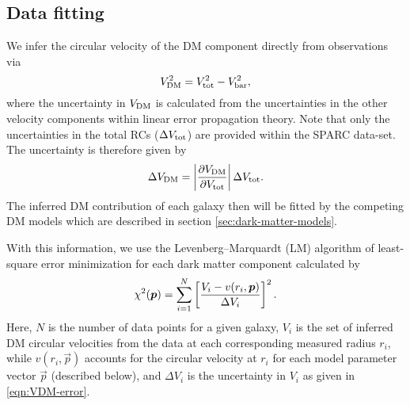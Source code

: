 \subsection{Data fitting}
\label{LM-fitting}

We infer the circular velocity of the DM component directly from observations via 
%
\begin{equation}
	\label{eqn:baryonic-diff}
	\SYMvdark^2 = \SYMvtot^2 - \SYMvbar^2,
\end{equation} 
%
where the uncertainty in $V_{\rm DM}$ is calculated from the uncertainties in the other velocity components within linear error propagation theory. Note that only the uncertainties in the total RCs ($\Delta V_{\rm tot}$) are provided within the SPARC data-set. The uncertainty is therefore given by
%
\begin{equation}\label{eqn:VDM-error}
    \Delta V_{\rm DM} = \abs{\diffpart{V_{\rm DM}}{V_{\rm tot}}} \Delta V_{\rm tot}.
\end{equation} 
%
The inferred DM contribution of each galaxy then will be fitted by the competing DM models which are described in section \ref{sec:dark-matter-models}.

With this information, we use the Levenberg–Marquardt (LM) algorithm of least-square error minimization for each dark matter component calculated by 
%
\begin{equation}
    \label{eqn:method:chi-square}
	\chi^2(\vec p) = \sum \limits_{i=1}^N \qbracket{\frac{V_i - v(r_i,\vec p)}{\Delta V_{i}}}^2.
\end{equation} 
%
Here, $N$ is the number of data points for a given galaxy, $V_i$ is the set of inferred DM circular velocities from the data at each corresponding measured radius $r_i$, while $v(r_i,\vec p)$ accounts for the circular velocity at $r_i$ for each model parameter vector $\vec p$ (described below), and $\Delta V_{i}$ is the uncertainty in $V_i$ as given in \cref{eqn:VDM-error}.
